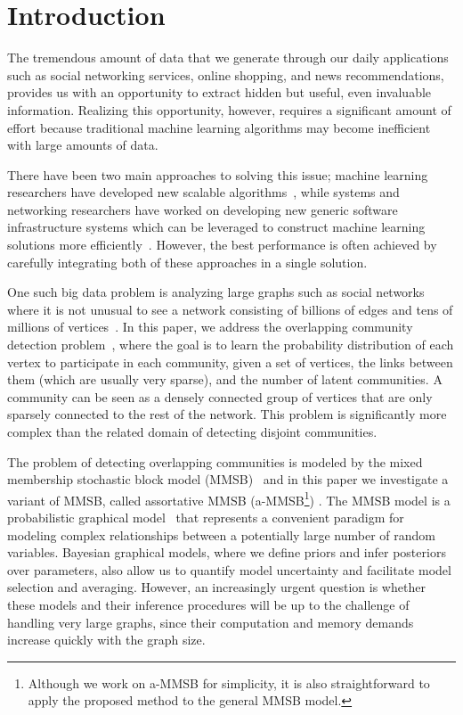 \section{Introduction}
The tremendous amount of data that we generate through our daily applications such as
social networking services, online shopping, and news recommendations, provides us
with an opportunity to extract hidden but useful, even invaluable information.
Realizing this opportunity, however, requires a significant amount of effort because
traditional machine learning algorithms may become inefficient with large amounts of data.

There have been two main approaches to solving this issue; machine learning researchers have developed new scalable algorithms~\cite{bottou2010large, boyd2011distributed}, while systems and networking researchers have worked on developing new generic software infrastructure systems which can be leveraged to construct machine learning solutions more efficiently~\cite{dean2008mapreduce, chang2008bigtable}.
However, the best performance is often achieved by carefully integrating both of these approaches in a single solution.

One such big data problem is analyzing large graphs such as social networks where it is not unusual to see a network consisting of billions of edges and tens of millions of vertices~\cite{yang2015defining}. In this paper, we address the overlapping community detection problem~\cite{xie2013overlapping}, where the goal is to learn the probability distribution of each vertex to participate in each community, given a set of vertices, the links between them (which are usually very sparse), and the number of latent communities. A community can be seen as a densely connected group of vertices that are only sparsely connected to the rest of the network. This problem is significantly more complex than the related domain of detecting disjoint communities.

The problem of detecting overlapping communities is modeled by the mixed membership stochastic block model (MMSB)~\cite{airoldi2009mixed} and in this paper we investigate a variant of MMSB, called assortative MMSB (a-MMSB\footnote{Although we work on a-MMSB for simplicity, it is also straightforward to apply the proposed method to the general MMSB model.}) \cite{gopalan2012scalable}.
The MMSB model is a probabilistic graphical model~\cite{koller2009probabilistic} that represents a convenient paradigm for modeling complex relationships between a potentially large number of random variables. Bayesian graphical models, where we define priors and infer posteriors over parameters, also allow us to quantify model uncertainty and facilitate model selection and averaging. However, an increasingly urgent question is whether these models and their inference procedures will be up to the challenge of handling very large graphs, since their computation and memory demands increase quickly with the graph size.

